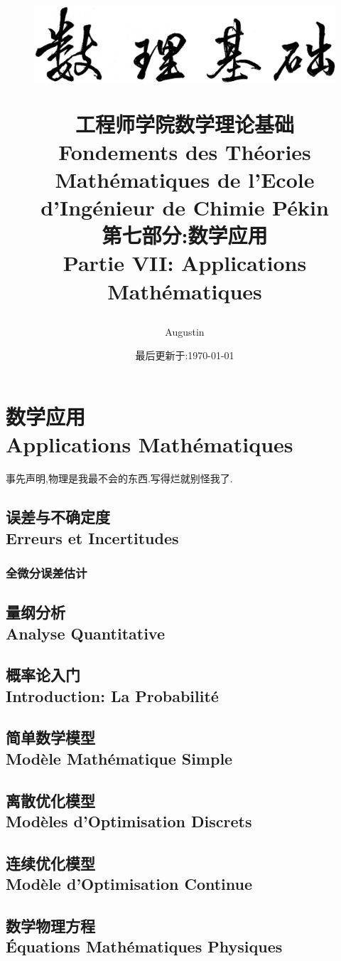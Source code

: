 \documentclass[12pt, a4paper, oneside]{ctexbook}
\title{
\vspace{-2cm}
  \begin{figure}[!t]%
    \centering
    \includegraphics[width=14cm]{shulijichu-2.png}
  \end{figure}
  \vspace{-2cm}
  {\Huge{\textbf{工程师学院数学理论基础\\
Fondements des Théories Mathématiques de l'Ecole d'Ingénieur de Chimie Pékin\\
第七部分:数学应用\\
Partie VII: Applications Mathématiques
}}}
}
\author{Augustin}
\date{最后更新于:\today}
\begin{document}
\vspace{-3cm}
\maketitle
\tableofcontents
\else
\part{数学应用\\ Applications Mathématiques}
\fi
事先声明,物理是我最不会的东西.写得烂就别怪我了.
\chapter{误差与不确定度\\Erreurs et Incertitudes}
\section{全微分误差估计}
\chapter{量纲分析\\ Analyse Quantitative}
\chapter{概率论入门\\Introduction: La Probabilité}
\chapter{简单数学模型\\ Modèle Mathématique Simple}  
\chapter{离散优化模型\\ Modèles d'Optimisation Discrets} 
\chapter{连续优化模型\\ Modèle d'Optimisation Continue} 


\chapter{数学物理方程\\ Équations Mathématiques Physiques}%
\end{document}
